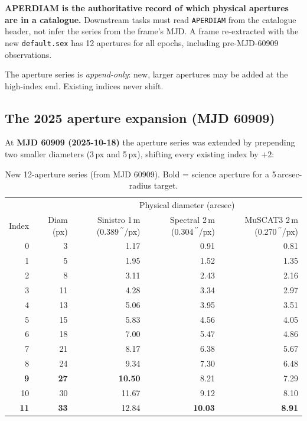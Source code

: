 \documentclass[12pt,a4paper]{article}
\begin{document}
\begin{warnbox}
\textbf{APERDIAM is the authoritative record of which physical apertures are
in a catalogue.}  Downstream tasks must read \texttt{APERDIAM} from the
catalogue header, not infer the series from the frame's MJD.  A frame
re-extracted with the new \texttt{default.sex} has 12 apertures for all
epochs, including pre-MJD-60909 observations.
\end{warnbox}

The aperture series is \emph{append-only}: new, larger apertures may be added
at the high-index end.  Existing indices never shift.

\subsection{The 2025 aperture expansion (MJD 60909)}
\label{sec:aper-expansion}

At \textbf{MJD 60909 (2025-10-18)} the aperture series was extended by
prepending two smaller diameters (3\,px and 5\,px), shifting every existing
index by $+2$:

\begin{table}[h!]
\centering
\small
\begin{tabular}{rr rrr}
\toprule
 & & \multicolumn{3}{c}{Physical diameter (arcsec)} \\
\cmidrule(lr){3-5}
Index & Diam (px) &
  \makecell{Sinistro 1\,m\\(0.389\,\ensuremath{^{\prime\prime}}/px)} &
  \makecell{Spectral 2\,m\\(0.304\,\ensuremath{^{\prime\prime}}/px)} &
  \makecell{MuSCAT3 2\,m\\(0.270\,\ensuremath{^{\prime\prime}}/px)} \\
\midrule
  0 &  3 &  1.17 &  0.91 &  0.81 \\
  1 &  5 &  1.95 &  1.52 &  1.35 \\
  2 &  8 &  3.11 &  2.43 &  2.16 \\
  3 & 11 &  4.28 &  3.34 &  2.97 \\
  4 & 13 &  5.06 &  3.95 &  3.51 \\
  5 & 15 &  5.83 &  4.56 &  4.05 \\
  6 & 18 &  7.00 &  5.47 &  4.86 \\
  7 & 21 &  8.17 &  6.38 &  5.67 \\
  8 & 24 &  9.34 &  7.30 &  6.48 \\
  \textbf{9} & \textbf{27} & \textbf{10.50} &  8.21 &  7.29 \\
 10 & 30 & 11.67 &  9.12 &  8.10 \\
 \textbf{11} & \textbf{33} & 12.84 & \textbf{10.03} & \textbf{8.91} \\
\bottomrule
\end{tabular}
\caption{New 12-aperture series (from MJD 60909).  Bold = science aperture
  for a 5\,arcsec-radius target.}
\label{tab:aper-new}
\end{table}
\end{document}
